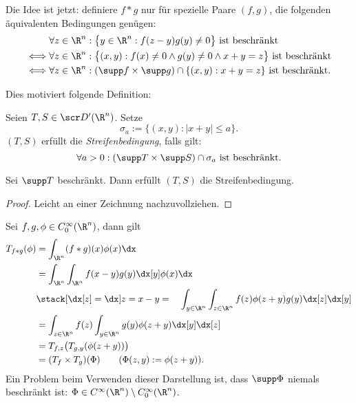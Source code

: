 Die Idee ist jetzt:
definiere $f \ast g$ nur für spezielle Paare $(f,g)$, die folgenden äquivalenten Bedingungen genügen:
\begin{align*}
	&\forall z \in \R^n : \big\{y \in \R^n : f(z-y) g(y) \neq 0 \big\} \text{ ist beschränkt} \\
	\iff &\forall z \in \R^n : \big\{(x,y) : f(x) \neq 0 \land g(y) \neq 0 \land x + y = z\big\} \text{ ist beschränkt} \\
	\iff &\forall z \in \R^n : (\supp f \times \supp g) \cap \{(x,y) : x+y = z \} \text{ ist beschränkt.}
\end{align*}

Dies motiviert folgende Definition:
\begin{df} \label{5.35}
	Seien $T, S \in \scr D'(\R^n)$.
	Setze
	\[
		\sigma_a := \big\{(x,y) : |x+y| \le a \big\}.
	\]
	$(T,S)$ erfüllt die \emph{Streifenbedingung}, falls gilt:
	\[
		\forall a > 0 :
		(\supp T \times \supp S) \cap \sigma_a
		\text{ ist beschränkt.}
	\]
\end{df}

\begin{ex} \label{5.36}
	Sei $\supp T$ beschränkt.
	Dann erfüllt $(T,S)$ die Streifenbedingung.
	\begin{proof}
		Leicht an einer Zeichnung nachzuvollziehen.
		\fixme[Zeichnung]
	\end{proof}
\end{ex}

\begin{nt} \label{5.37}
	Sei $f, g, \phi \in C_0^\infty(\R^n)$, dann gilt
	\begin{align*}
		T_{f\ast g}(\phi)
		&= \int_{\R^n} (f\ast g)(x)\phi(x) \dx \\
		&= \int_{\R^n} \int_{\R^n} f(x-y)g(y) \dx[y] \phi(x) \dx \\
		&\stack[{\dx[z]=\dx}]{z=x-y} =\quad \int_{y\in \R^n} \int_{z\in \R^n} f(z) \phi(z+y) g(y) \dx[z] \dx[y] \\
		&= \int_{z\in \R^n} f(z) \int_{y\in \R^n} g(y) \phi(z+y) \dx[y] \dx[z] \\
		&= T_{f,z} \big( T_{g,y} (\phi(z+y)) \big) \\
		&= (T_f \times T_g) (\Phi) \qquad (\Phi(z,y) := \phi(z+y)).
	\end{align*}
	Ein Problem beim Verwenden dieser Darstellung ist, dass $\supp \Phi$ niemals beschränkt ist: $\Phi \in C^\infty(\R^n) \setminus C_0^\infty(\R^n)$.
\end{nt}

